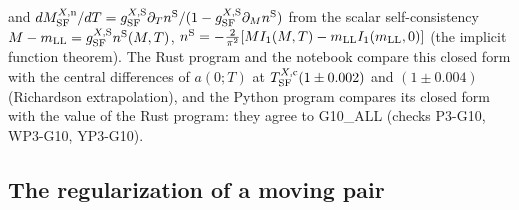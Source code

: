 \documentclass[aps,prd,onecolumn,superscriptaddress,nofootinbib,floatfix,longbibliography]{revtex4-2}
\newcommand{\LL}{{\rm LL}}
\newcommand{\SF}{{\rm SF}}
\begin{document}
and $dM^{X,{\rm n}}_\SF/dT=g^{X,{\rm S}}_\SF\partial_Tn^{\rm S}/(1-g^{X,{\rm S}}_\SF\partial_Mn^{\rm S})$ from the scalar self-consistency
$M-m_\LL=g^{X,{\rm S}}_\SF n^{\rm S}(M,T)$, $n^{\rm S}=-\frac2{\pi^2}[MI_1(M,T)-m_\LL I_1(m_\LL,0)]$ (the implicit function theorem). The Rust program
and the notebook compare this closed form with the central differences of $a(0;T)$ at $T^{X,{\rm c}}_\SF(1\pm0.002)$ and $(1\pm0.004)$
(Richardson extrapolation), and the Python program compares its closed form with the value of the Rust program: they agree to
{{G10_ALL}} (checks P3-G10, WP3-G10, YP3-G10).

\subsection{The regularization of a moving pair}
\label{sec:reg}
\end{document}
